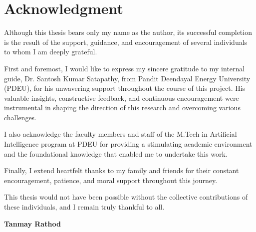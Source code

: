 \section*{\textcolor{internationalkleinblue}{\textbf{Acknowledgment}}}

Although this thesis bears only my name as the author, its successful completion is the result of the support, guidance, and encouragement of several individuals to whom I am deeply grateful.

First and foremost, I would like to express my sincere gratitude to my internal guide, Dr. Santosh Kumar Satapathy, from Pandit Deendayal Energy University (PDEU), for his unwavering support throughout the course of this project. His valuable insights, constructive feedback, and continuous encouragement were instrumental in shaping the direction of this research and overcoming various challenges.

I also acknowledge the faculty members and staff of the M.Tech in Artificial Intelligence program at PDEU for providing a stimulating academic environment and the foundational knowledge that enabled me to undertake this work.

Finally, I extend heartfelt thanks to my family and friends for their constant encouragement, patience, and moral support throughout this journey.

This thesis would not have been possible without the collective contributions of these individuals, and I remain truly thankful to all.

\begin{flushright}
	\textbf{Tanmay Rathod}\\
\end{flushright}
